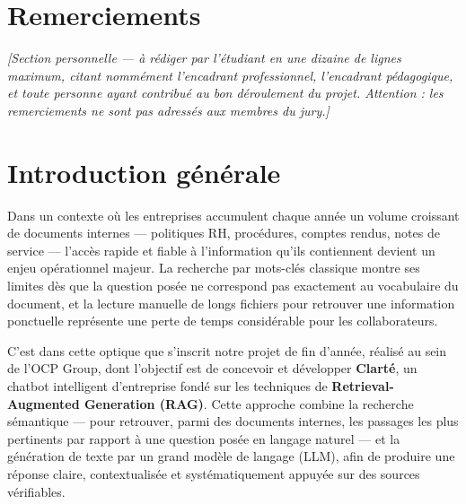 \documentclass[12pt,a4paper]{report}
\newcommand{\note}[1]{\textit{[#1]}}
\begin{document}
\chapter*{Remerciements}
\note{Section personnelle — à rédiger par l'étudiant en une dizaine de lignes maximum, citant nommément l'encadrant professionnel, l'encadrant pédagogique, et toute personne ayant contribué au bon déroulement du projet. Attention : les remerciements ne sont pas adressés aux membres du jury.}

\tableofcontents
\listoffigures
\listoftables

\chapter*{Introduction générale}

Dans un contexte où les entreprises accumulent chaque année un volume croissant de documents internes — politiques RH, procédures, comptes rendus, notes de service — l'accès rapide et fiable à l'information qu'ils contiennent devient un enjeu opérationnel majeur. La recherche par mots-clés classique montre ses limites dès que la question posée ne correspond pas exactement au vocabulaire du document, et la lecture manuelle de longs fichiers pour retrouver une information ponctuelle représente une perte de temps considérable pour les collaborateurs.

C'est dans cette optique que s'inscrit notre projet de fin d'année, réalisé au sein de l'OCP Group, dont l'objectif est de concevoir et développer \textbf{Clarté}, un chatbot intelligent d'entreprise fondé sur les techniques de \textbf{Retrieval-Augmented Generation (RAG)}. Cette approche combine la recherche sémantique — pour retrouver, parmi des documents internes, les passages les plus pertinents par rapport à une question posée en langage naturel — et la génération de texte par un grand modèle de langage (LLM), afin de produire une réponse claire, contextualisée et systématiquement appuyée sur des sources vérifiables.
\end{document}
